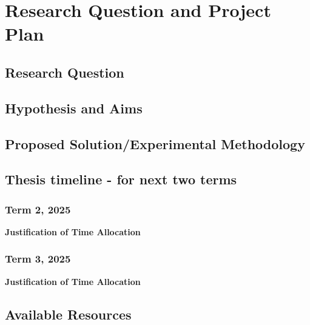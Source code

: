 \section{Research Question and Project Plan}


\subsection{Research Question}
\subsection{Hypothesis and Aims}
\subsection{Proposed Solution/Experimental Methodology}
\pagebreak

\subsection{Thesis timeline - for next two terms}
\subsubsection{Term 2, 2025}
\noindent \textbf{Justification of Time Allocation}
\subsubsection{Term 3, 2025}
\noindent \textbf{Justification of Time Allocation}
\pagebreak

\subsection{Available Resources}
